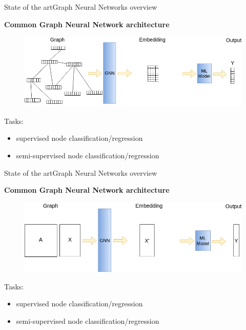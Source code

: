 \documentclass[xcolor=table]{beamer}
\begin{document}
\begin{frame}{State of the art}{Graph Neural Networks overview}

\textbf{Common Graph Neural Network architecture}
\begin{figure}
    \includegraphics[scale=0.37]{./img/GNN_explanation_04.png}
\end{figure}
\vspace{-10px}
Tasks:
\begin{itemize}
    \item supervised node classification/regression
    \item semi-supervised node classification/regression
\end{itemize}

\end{frame}



\begin{frame}{State of the art}{Graph Neural Networks overview}

\textbf{Common Graph Neural Network architecture}
\begin{figure}
    \includegraphics[scale=0.35]{./img/GNN_explanation_05.png}
\end{figure}
\vspace{-10px}
Tasks:
\begin{itemize}
    \item supervised node classification/regression
    \item semi-supervised node classification/regression
\end{itemize}

\end{frame}
\end{document}
